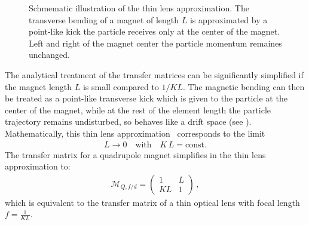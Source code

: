 \begin{figure}[b]  
  \centering
  \caption{Schmematic illustration of the thin lens approximation. The transverse bending of a magnet of length $L$ is approximated by a point-like kick the particle receives only at the center of the magnet. Left and right of the magnet center the particle momentum remaines unchanged.}
  \label{pic:thinlens}
\end{figure}









The analytical treatment of the transfer matrices can be significantly simplified if the magnet length $L$ is small compared to $1/KL$. The magnetic bending can then be treated as a point-like transverse kick which is given to the particle at the center of the magnet, while at the rest of the element length the particle trajectory remains undisturbed, so behaves like a drift space (see ). Mathematically, this thin lens approximation~\cite{CERN-SL-95-12} corresponds to the limit
\begin{align}
  L \rightarrow 0 \quad \text{with} \quad K \, L = \text{const.} 
\end{align} 
The transfer matrix for a quadrupole magnet simplifies in the thin lens approximation to:
\begin{align}
  \mathcal{M}_{Q,f/d} = \begin{pmatrix}  1 & L \\   KL & 1  \end{pmatrix} \, ,
\end{align}
which is equivalent to the transfer matrix of a thin optical lens with focal length $f=\frac{1}{KL}$.
%

